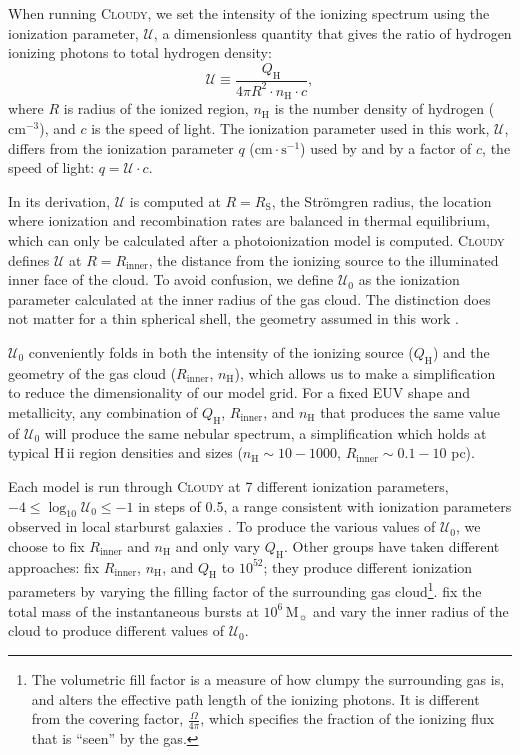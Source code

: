 \documentclass[linenumbers, trackchanges, tighten]{aastex61}%
\newcommand{\strom}{Str{\"o}mgren}
\newcommand{\Cloudy}{\textsc{Cloudy}\xspace}
\newcommand{\logten}{\ensuremath{\log_{10}}}
\newcommand\Msun{\ensuremath{\mathrm{M_{\sun}}}}
\newcommand{\hii}{H\,{\sc ii}\xspace}
\newcommand{\nH}{\ensuremath{n_{\mathrm{H}}}}
\newcommand{\cm}[1]{\ensuremath{\mathrm{cm}^{#1}}}
\newcommand{\Rin}{\ensuremath{R_{\mathrm{inner}}}}
\newcommand{\QH}{\ensuremath{Q_{\mathrm{H}}}}
\newcommand{\U}{\ensuremath{\mathcal{U}_{0}}}
\newcommand{\Up}{\ensuremath{\mathcal{U}}}
\newcommand{\Rs}{\ensuremath{R_{\mathrm{S}}}}
\newcommand\cms{\ensuremath{\mathrm{cm} \cdot \mathrm{s}^{-1}}}
\newcommand{\logU}{\ensuremath{\logten \mathcal{U}_0}}
\begin{document}
When running \Cloudy, we set the intensity of the ionizing spectrum using the ionization parameter, $\Up$, a dimensionless quantity that gives the ratio of hydrogen ionizing photons to total hydrogen density:
\begin{equation}\label{eq:logU}
    \Up \equiv \frac{\QH{}}{4 \pi R^2 \cdot \nH \cdot c},
\end{equation}
where $R$ is radius of the ionized region, \nH{} is the number density of hydrogen (\cm{-3}), and $c$ is the speed of light. The ionization parameter used in this work, \Up{}, differs from the ionization parameter $q$ (\cms) used by \citet{Levesque10} and \citet{Dopita13} by a factor of $c$, the speed of light: $q = \Up \cdot c$.

In its derivation, \Up{} is computed at $R = \Rs$, the \strom{} radius, the location where ionization and recombination rates are balanced in thermal equilibrium, which can only be calculated after a photoionization model is computed. \Cloudy defines \Up{} at $R = \Rin$, the distance from the ionizing source to the illuminated inner face of the cloud. To avoid confusion, we define \U{} as the ionization parameter calculated at the inner radius of the gas cloud. The distinction does not matter for a thin spherical shell, the geometry assumed in this work \citep[for details see][]{CL01}.

\U{} conveniently folds in both the intensity of the ionizing source (\QH{}) and the geometry of the gas cloud (\Rin{}, \nH{}), which allows us to make a simplification to reduce the dimensionality of our model grid. For a fixed EUV shape and metallicity, any combination of \QH{}, \Rin{}, and \nH{} that produces the same value of \U{} will produce the same nebular spectrum, a simplification which holds at typical \hii region densities and sizes ($\nH{} \sim 10-1000$, $\Rin \sim 0.1-10$ pc). 

Each model is run through \Cloudy at 7 different ionization parameters, $-4 \leq \logU \leq -1$ in steps of 0.5, a range consistent with ionization parameters observed in local starburst galaxies \citep{Rigby04}. To produce the various values of \U{}, we choose to fix \Rin{} and \nH{} and only vary \QH{}. Other groups have taken different approaches: \citet{Moy01} fix \Rin{}, \nH{}, and \QH{} to $10^{52}$; they produce different ionization parameters by varying the filling factor of the surrounding gas cloud\footnote{The volumetric fill factor is a measure of how clumpy the surrounding gas is, and alters the effective path length of the ionizing photons. It is different from the covering factor, $\frac{\Omega}{4\pi}$, which specifies the fraction of the ionizing flux that is ``seen'' by the gas.}. \citet{Levesque10} fix the total mass of the instantaneous bursts at $10^6\,\Msun$ and vary the inner radius of the cloud to produce different values of \U{}.
\end{document}
